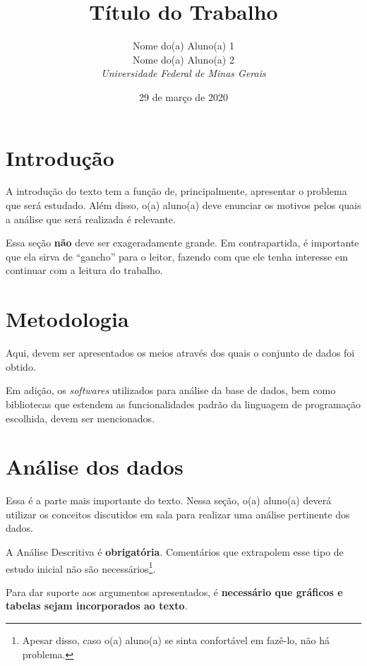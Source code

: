 \documentclass[12pt]{article}
\title{Título do Trabalho}
\author{Nome do(a) Aluno(a) 1 \\
		Nome do(a) Aluno(a) 2 \\
		\textit{\small{Universidade Federal de Minas Gerais}}}
\date{29 de março de 2020}
\begin{document}
	
	\maketitle
	
	\section{Introdução} \label{sec:introducao}
	
	\par A introdução do texto tem a função de, principalmente, apresentar o problema que será estudado. Além disso, o(a) aluno(a) deve enunciar os motivos pelos quais a análise que será realizada é relevante.
	
	\par Essa seção \textbf{não} deve ser exageradamente grande. Em contrapartida, é importante que ela sirva de ``gancho'' para o leitor, fazendo com que ele tenha interesse em continuar com a leitura do trabalho.
	
	\section{Metodologia} \label{sec:metodologia}
	
	\par Aqui, devem ser apresentados os meios através dos quais o conjunto de dados foi obtido. 
	
	\par Em adição, os \textit{softwares} utilizados para análise da base de dados, bem como bibliotecas que estendem as funcionalidades padrão da linguagem de programação escolhida, devem ser mencionados.
	
	\section{Análise dos dados} \label{sec:analise}
	
	\par Essa é a parte mais importante do texto. Nessa seção, o(a) aluno(a) deverá utilizar os conceitos discutidos em sala para realizar uma análise pertinente dos dados. 
	
	\par A Análise Descritiva é \textbf{obrigatória}. Comentários que extrapolem esse tipo de estudo inicial não são necessários\footnote{Apesar disso, caso o(a) aluno(a) se sinta confortável em fazê-lo, não há problema.}.
	
	\par Para dar suporte aos argumentos apresentados, é \textbf{\color{red} necessário que gráficos e tabelas sejam incorporados ao texto}.
	
\end{document}
